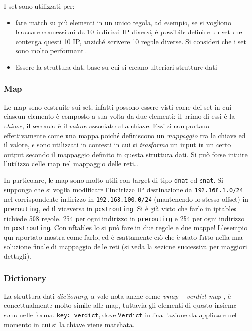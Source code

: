 I set sono utilizzati per:
\begin{itemize}
	\item fare match su più elementi in un unico regola, ad esempio, se si vogliono
	      bloccare connessioni da 10 indirizzi IP diversi, è possibile definire un set
	      che contenga questi 10 IP, anziché scrivere 10 regole diverse. Si consideri che
	      i set sono molto performanti.
	\item Essere la struttura dati base su cui si creano ulteriori strutture dati.
\end{itemize}


\subsubsection{Map}
Le map sono costruite sui set, infatti possono essere visti come dei set in cui
ciascun elemento è composto a sua volta da due elementi: il primo di essi
è la \textit{chiave}, il secondo è il \textit{valore} associato alla chiave. Essi
si comportano effettivamente come una mappa poiché definiscono un \textit{mappaggio}
tra la chiave ed il valore, e sono utilizzati in contesti in cui si \textit{trasforma}
un input in un certo output secondo il mappaggio definito in questa struttura dati.
Si può forse intuire l'utilizzo delle map nel mappaggio delle reti\ldots


In particolare, le map sono molto utili con target di tipo \texttt{dnat} ed \texttt{snat}.
Si supponga che si voglia modificare l'indirizzo IP destinazione da \texttt{192.168.1.0/24}
nel corrispondente indirizzo in \texttt{192.168.100.0/24} (mantenendo lo stesso
offset) in \texttt{prerouting}, ed il viceversa in \texttt{postrouting}. Si
è già visto che farlo in iptables richiede 508 regole, 254 per ogni indirizzo in
\texttt{prerouting} e 254 per ogni indirizzo in \texttt{postrouting}. Con nftables
lo si può fare in due regole e due mappe!
L'esempio qui riportato mostra come farlo, ed è esattamente ciò che è stato fatto
nella mia soluzione finale di mappaggio delle reti (si veda la sezione successiva
per maggiori dettagli).


\subsubsection{Dictionary}
La struttura dati \textit{dictionary}, a vole nota anche come \textit{vmap -- verdict map}
, è concettualmente
molto simile alle map, tuttavia gli elementi di questo insieme sono nelle forma:
\texttt{key: verdict}, dove \texttt{Verdict} indica l'azione da applicare nel
momento in cui si la chiave viene
matchata.

